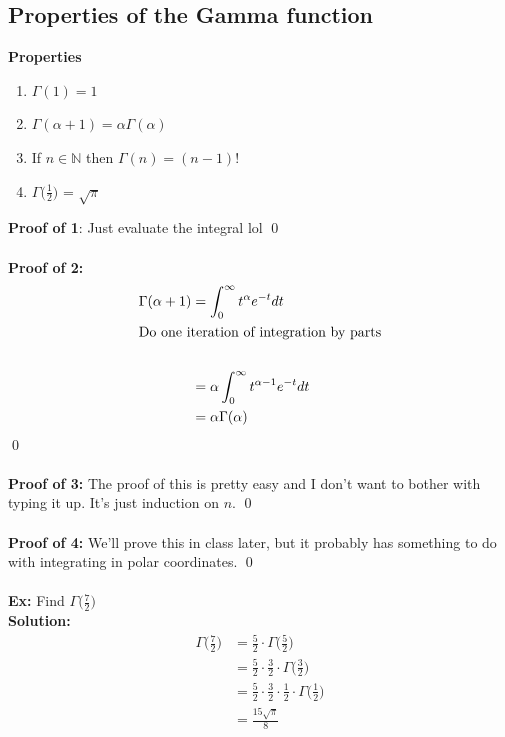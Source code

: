 \documentclass{article}
\newcommand{\N}{\mathbb{N}}
\newcommand{\x}{\cdot}
\newcommand{\Ga}{\Gamma}
\begin{document}
\subsection{Properties of the Gamma function}
\textbf{Properties}
\begin{enumerate}
	\item $\Ga(1) = 1$
	\item $\Ga(\alpha + 1) = \alpha \Ga(\alpha)$
	\item If $n \in \N$ then $\Ga(n) = (n-1)!$
	\item $\Ga\big(\frac{1}{2}\big)$ = $\sqrt{\pi}$
\end{enumerate}
\textbf{Proof of 1}: Just evaluate the integral lol
\qed\\\\
\textbf{Proof of 2:}
\begin{align*}
	\Ga(\alpha +1) &= \int_{0}^{\infty} t^{\alpha}e^{-t} dt\\
	\intertext{Do one iteration of integration by parts}\\
				&= \alpha \int_{0}^{\infty} t^{\alpha-1}e^{-t} dt\\
				&= \alpha \Ga(\alpha)
\end{align*}
\qed\\\\
\textbf{Proof of 3:} The proof of this is pretty easy and I don't want to bother with typing it up. It's just induction on $n$.
\qed\\\\
\textbf{Proof of 4:} We'll prove this in class later, but it probably has something to do with integrating in polar coordinates. 
\qed\\\\
\textbf{Ex:} Find $\Ga\big(\frac{7}{2}\big)$\\
\textbf{Solution:}
\begin{align*}
	\Ga\bigg(\frac{7}{2}\bigg) &= \frac{5}{2}\x\Ga\bigg(\frac{5}{2}\bigg)\\
						&= \frac{5}{2}\x\frac{3}{2}\x\Ga\bigg(\frac{3}{2}\bigg)\\
						&= \frac{5}{2}\x\frac{3}{2}\x\frac{1}{2}\x\Ga\bigg(\frac{1}{2}\bigg)\\
						&= \frac{15\sqrt{\pi}}{8}
\end{align*}
\end{document}
